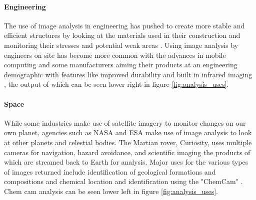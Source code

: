 	\paragraph{Engineering}
	The use of image analysis in engineering has pushed to create more stable and efficient structures by looking at the materials used in their construction \citep{concreteanalysis} and monitoring their stresses and potential weak areas \citep{bridgecables}. Using image analysis by engineers on site has become more common with the advances in mobile computing and some manufacturers aiming their products at an engineering demographic with features like improved durability and built in infrared imaging \citep{catphone}, the output of which can be seen lower right in figure \ref{fig:analysis_uses}.
	\paragraph{Space}
	While some industries make use of satellite imagery to monitor changes on our own planet, agencies such as NASA and ESA make use of image analysis to look at other planets and celestial bodies. The Martian rover, Curiosity, uses multiple cameras for navigation, hazard avoidance, and scientific imaging the products of which are streamed back to Earth for analysis. Major uses for the various types of images returned include identification of geological formations and compositions \citep{curiositysand, curiositygravel} and chemical location and identification using the "ChemCam" \citep{curiosityhydrogen}. Chem cam analysis can be seen lower left in figure \ref{fig:analysis_uses}.